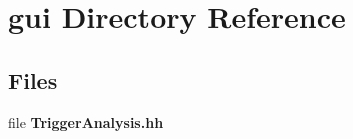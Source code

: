 \section{gui Directory Reference}
\label{dir_3dd9b1b4eb411963bc747062b26cffdc}
\subsection*{Files}
\begin{DoxyCompactItemize}
\item 
file {\bfseries Trigger\-Analysis.\-hh}
\end{DoxyCompactItemize}

